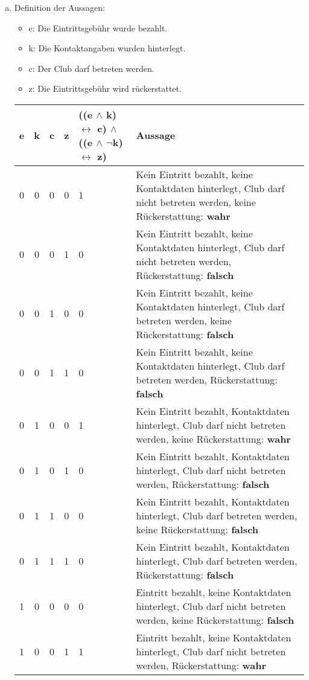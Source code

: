 \documentclass[12pt,a4paper]{article}
\begin{document}
\begin{enumerate}[a)]
\item Definition der Aussagen:
\begin{itemize}
\item e: Die Eintrittsgebühr wurde bezahlt.
\item k: Die Kontaktangaben wurden hinterlegt.
\item c: Der Club darf betreten werden.
\item z: Die Eintrittsgebühr wird rückerstattet.
\end{itemize}



\begin{tabular}{c|c|c|c|p{}|p{}}
e & k & c & z & ((e $\land$ k) $\leftrightarrow$ c) $\land$ ((e $\land$ $\neg$k) $\leftrightarrow$ z) & Aussage\\
\hline
0 & 0 & 0 & 0 & 1 & Kein Eintritt bezahlt, keine Kontaktdaten hinterlegt, Club darf nicht betreten werden, keine Rückerstattung: \textbf{wahr}\\
\hline
0 & 0 & 0 & 1 & 0 & Kein Eintritt bezahlt, keine Kontaktdaten hinterlegt, Club darf nicht betreten werden, Rückerstattung: \textbf{falsch}\\
\hline
0 & 0 & 1 & 0 & 0 & Kein Eintritt bezahlt, keine Kontaktdaten hinterlegt, Club darf betreten werden, keine Rückerstattung: \textbf{falsch}\\
\hline
0 & 0 & 1 & 1 & 0 & Kein Eintritt bezahlt, keine Kontaktdaten hinterlegt, Club darf betreten werden, Rückerstattung: \textbf{falsch}\\
\hline
0 & 1 & 0 & 0 & 1 & Kein Eintritt bezahlt, Kontaktdaten hinterlegt, Club darf nicht betreten werden, keine Rückerstattung: \textbf{wahr}\\
\hline
0 & 1 & 0 & 1 & 0 & Kein Eintritt bezahlt, Kontaktdaten hinterlegt, Club darf nicht betreten werden, Rückerstattung: \textbf{falsch}\\
\hline
0 & 1 & 1 & 0 & 0 & Kein Eintritt bezahlt, Kontaktdaten hinterlegt, Club darf betreten werden, keine Rückerstattung: \textbf{falsch}\\
\hline
0 & 1 & 1 & 1 & 0 & Kein Eintritt bezahlt, Kontaktdaten hinterlegt, Club darf betreten werden, Rückerstattung: \textbf{falsch}\\
\hline
1 & 0 & 0 & 0 & 0 & Eintritt bezahlt, keine Kontaktdaten hinterlegt, Club darf nicht betreten werden, keine Rückerstattung: \textbf{falsch}\\
\hline
1 & 0 & 0 & 1 & 1 & Eintritt bezahlt, keine Kontaktdaten hinterlegt, Club darf nicht betreten werden, Rückerstattung: \textbf{wahr}\\

\end{tabular}
\end{enumerate}
\end{document}
